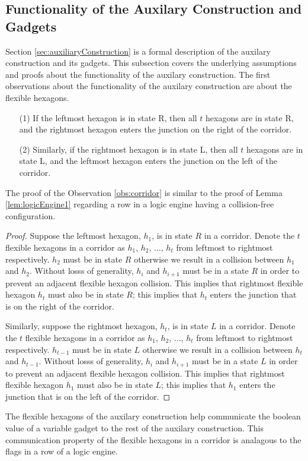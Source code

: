 \subsection{Functionality of the Auxilary Construction and Gadgets}
Section \ref{sec:auxiliaryConstruction} is a formal description of the auxilary construction and its gadgets.
This subsection covers the underlying assumptions and proofs about the functionality of the auxilary construction.
The first observations about the functionality of the auxilary construction are about the flexible hexagons.
\begin{observation}\label{obs:corridor}

\begin{itemize}

\item[(1)] If the leftmost hexagon is in state R, then all $t$ hexagons are in state R, and the rightmost hexagon enters the junction on the right of the corridor.
\item[(2)] Similarly, if the rightmost hexagon is in state L, then all $t$ hexagons are in state L, and the leftmost hexagon enters the junction on the left of the corridor.
\end{itemize}
\end{observation}
The proof of the Observation \ref{obs:corridor} is similar to the proof of Lemma \ref{lem:logicEngine1} regarding a row in a logic engine having a collision-free configuration.
\begin{proof}
Suppose the leftmost hexagon, $h_1$, is in state $R$ in a corridor.
Denote the $t$ flexible hexagons in a corridor as $h_1$, $h_2$, $\ldots$, $h_t$ from leftmost to rightmost respectively.
$h_2$ must be in state $R$ otherwise we result in a collision between $h_1$ and $h_2$.
Without losss of generality, $h_i$ and $h_{i+1}$ must be in a state $R$ in order to prevent an adjacent flexible hexagon collision. 
This implies that rightmost flexible hexagon $h_t$ must also be in state $R$; this implies that $h_t$ enters the junction that is on the right of the corridor.

Similarly, suppose the rightmost hexagon, $h_t$, is in state $L$ in a corridor.
Denote the $t$ flexible hexagons in a corridor as $h_1$, $h_2$, $\ldots$, $h_t$ from leftmost to rightmost respectively.
$h_{t-1}$ must be in state $L$ otherwise we result in a collision between $h_t$ and $h_{t-1}$.
Without losss of generality, $h_i$ and $h_{i+1}$ must be in a state $L$ in order to prevent an adjacent flexible hexagon collision. 
This implies that rightmost flexible hexagon $h_1$ must also be in state $L$; this implies that $h_1$ enters the junction that is on the left of the corridor.
\end{proof}
The flexible hexagons of the auxilary construction help communicate the boolean value of a variable gadget to the rest of the auxilary construction.
This communication property of the flexible hexagons in a corridor is analagous to the flags in a row of a logic engine.

